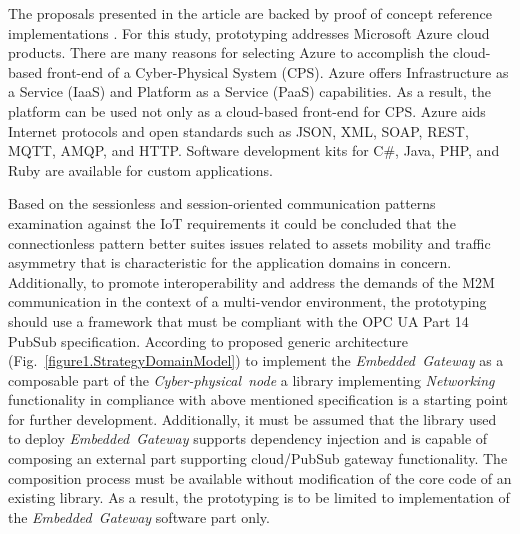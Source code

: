 \documentclass[runningheads]{llncs}
\begin{document}
The proposals presented in the article are backed by proof of concept reference implementations \cite{mariusz_postol_2020_4361640}. For this study, prototyping addresses Microsoft Azure cloud products. There are many reasons for selecting Azure to accomplish the cloud-based front-end of a Cyber-Physical System (CPS). Azure offers Infrastructure as a Service (IaaS) and Platform as a Service (PaaS) capabilities. As a result, the platform can be used not only as a cloud-based front-end for CPS. Azure aids Internet protocols and open standards such as JSON, XML, SOAP, REST, MQTT\cite{RefWorks:doc:5d91e158e4b02eb43d36bb97}, AMQP\cite{RefWorks:doc:5d91d2d9e4b0bc72a68ffe06}, and HTTP. Software development kits for C\#, Java, PHP, and Ruby are available for custom applications.

Based on the sessionless and session-oriented communication patterns examination against the IoT requirements \cite{mpostol2020} it could be concluded that the connectionless pattern better suites issues related to assets mobility and traffic asymmetry that is characteristic for the application domains in concern. Additionally, to promote interoperability and address the demands of the M2M communication in the context of a multi-vendor environment, the prototyping should use a framework that must be compliant with the OPC UA Part 14 PubSub  specification. According to proposed generic architecture (Fig.~\ref{figure1.StrategyDomainModel}) to implement the \emph{Embedded\ Gateway} as a composable part of the \emph{Cyber-physical\ node} a library implementing \emph{Networking} functionality in compliance with above mentioned specification is a starting point for further development. Additionally, it must be assumed that the library used to deploy \emph{Embedded\ Gateway} supports dependency injection and is capable of composing an external part supporting cloud/PubSub gateway functionality. The composition process must be available without modification of the core code of an existing library. As a result, the prototyping is to be limited to implementation of the \emph{Embedded\ Gateway} software part only.
\end{document}
